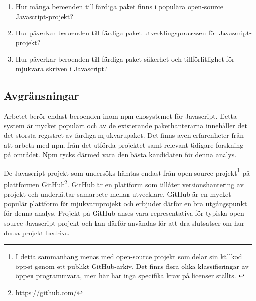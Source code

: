\begin{enumerate}
  \item\label{joel_o-fs:1} Hur många beroenden till färdiga paket finns i populära open-source Javascript-projekt?

  \item\label{joel_o-fs:2} Hur påverkar beroenden till färdiga paket utvecklingsprocessen för Javascript-projekt?

  \item\label{joel_o-fs:3} Hur påverkar beroenden till färdiga paket säkerhet och tillförlitlighet för mjukvara skriven i Javascript?
\end{enumerate}

\subsection{Avgränsningar}
\label{subsec:joel_o-delimitations}
Arbetet berör endast beroenden inom npm-ekosystemet för Javascript. Detta system är mycket populärt och av de existerande pakethanterarna innehåller det det största registret av färdiga mjukvarupaket.\cite{Decan2018} Det finns även erfarenheter från att arbeta med npm från det utförda projektet samt relevant tidigare forskning på området. Npm tycks därmed vara den bästa kandidaten för denna analys.

De Javascript-projekt som undersöks hämtas endast från open-source-projekt\footnote{I detta sammanhang menas med open-source projekt som delar sin källkod öppet genom ett publikt GitHub-arkiv. Det finns flera olika klassifieringar av öppen programmvara, men här har inga specifika krav på licenser ställts. \cite{what-is-open-source}} på plattformen GitHub\footnote{https://github.com/}. GitHub är en plattform som tillåter versionshantering av projekt och underlättar samarbete mellan utvecklare. GitHub är en mycket populär plattform för mjukvaruprojekt och erbjuder därför en bra utgångspunkt för denna analys. Projekt på GitHub anses vara representativa för typiska open-source Javascript-projekt och kan därför användas för att dra slutsatser om hur dessa projekt bedrivs.
